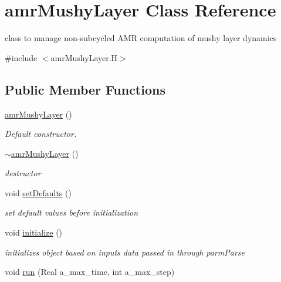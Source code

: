 \hypertarget{classamr_mushy_layer}{\section{amr\-Mushy\-Layer Class Reference}
\label{classamr_mushy_layer}
}


class to manage non-\/subcycled A\-M\-R computation of mushy layer dynamics  




{\ttfamily \#include $<$amr\-Mushy\-Layer.\-H$>$}

\subsection*{Public Member Functions}
\begin{DoxyCompactItemize}
\item 
\hyperlink{classamr_mushy_layer_a24060c00c555f171a510316e485e717a}{amr\-Mushy\-Layer} ()
\begin{DoxyCompactList}\small\item\em Default constructor. \end{DoxyCompactList}\item 
\hyperlink{classamr_mushy_layer_af0ccf706c8d1181abd8dd76fc4c51486}{$\sim$amr\-Mushy\-Layer} ()
\begin{DoxyCompactList}\small\item\em destructor \end{DoxyCompactList}\item 
\hypertarget{classamr_mushy_layer_a05a7ecf7f66e663d8fb68de84e6a5fc5}{void \hyperlink{classamr_mushy_layer_a05a7ecf7f66e663d8fb68de84e6a5fc5}{set\-Defaults} ()}\label{classamr_mushy_layer_a05a7ecf7f66e663d8fb68de84e6a5fc5}

\begin{DoxyCompactList}\small\item\em set default values before initialization \end{DoxyCompactList}\item 
void \hyperlink{classamr_mushy_layer_ac1e6c05047b20f43c849ffb5e409563e}{initialize} ()
\begin{DoxyCompactList}\small\item\em initializes object based on inputs data passed in through parm\-Parse \end{DoxyCompactList}\item 
\hypertarget{classamr_mushy_layer_ad3348089d05d4c0d90a9dbbfc2d62cd4}{void \hyperlink{classamr_mushy_layer_ad3348089d05d4c0d90a9dbbfc2d62cd4}{run} (Real a\-\_\-max\-\_\-time, int a\-\_\-max\-\_\-step)}\label{classamr_mushy_layer_ad3348089d05d4c0d90a9dbbfc2d62cd4}


\end{DoxyCompactItemize}
